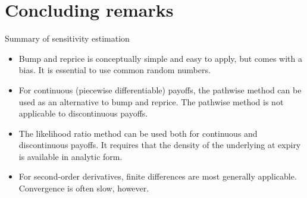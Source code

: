 \documentclass[pdf, handout]{beamer}
\begin{document}
\section{Concluding remarks}

\begin{frame}{Summary of sensitivity estimation}
\begin{itemize}
\item Bump and reprice is conceptually simple and easy to apply, but comes with a bias.
It is essential to use common random numbers.\pause
\item For continuous (piecewise differentiable) payoffs, the pathwise method can be
used as an alternative to bump and reprice. The pathwise method is not applicable to
discontinuous payoffs.\pause
\item The likelihood ratio method can be used both for continuous and discontinuous
payoffs. It requires that the density of the underlying at expiry is available in
analytic form.\pause
\item For second-order derivatives, finite differences are most generally applicable.
Convergence is often slow, however.
\end{itemize}
\end{frame}
\end{document}
